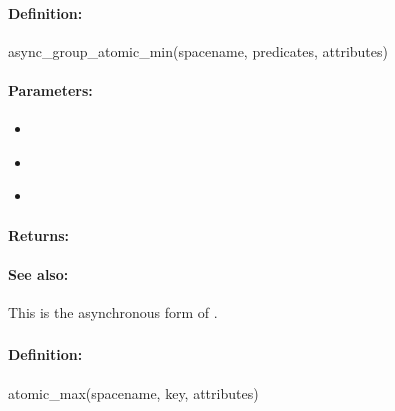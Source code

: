 \paragraph{Definition:}
\begin{rubycode}
async_group_atomic_min(spacename, predicates, attributes)
\end{rubycode}

\paragraph{Parameters:}
\begin{itemize}[noitemsep]
\item {}\\

\item {}\\

\item {}\\

\end{itemize}

\paragraph{Returns:}


\paragraph{See also:}  This is the asynchronous form of .

\pagebreak
\subsubsection{}
\label{api:ruby:atomic_max}


\paragraph{Definition:}
\begin{rubycode}
atomic_max(spacename, key, attributes)
\end{rubycode}

